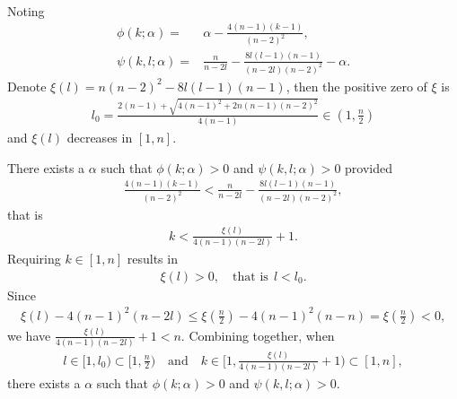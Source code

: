 \documentclass[12pt]{amsart}
\numberwithin{equation}{section}
\begin{document}
\ \\

Noting
\begin{align*}
    \phi(k;\alpha)=&\alpha-\frac{4(n-1)(k-1)}{(n-2)^2},\\
    \psi(k,l;\alpha)=&\frac{n}{n-2l}-\frac{8l(l-1)(n-1)}{(n-2l)(n-2)^2}-\alpha.
\end{align*}
Denote $\xi(l)=n(n-2)^2-8l(l-1)(n-1)$, then the positive zero of $\xi$ is 
\begin{align*}
    l_0=\frac{2(n-1)+\sqrt{4(n-1)^2+2n(n-1)(n-2)^2}}{4(n-1)}\in(1,\frac{n}{2})
\end{align*}
and $\xi(l)$ decreases in $[1,n]$.

There exists a $\alpha$ such that $\phi(k;\alpha)>0$ and $\psi(k,l;\alpha)>0$ provided
\begin{align*}
    \frac{4(n-1)(k-1)}{(n-2)^2}<\frac{n}{n-2l}-\frac{8l(l-1)(n-1)}{(n-2l)(n-2)^2},
\end{align*}
that is
\begin{align*}
    k<\frac{\xi(l)}{4(n-1)(n-2l)}+1.
\end{align*}
Requiring $k\in[1,n]$ results in
\begin{align*}
    \xi(l)>0,\quad \text{that is}\ \ l<l_0.
\end{align*}
Since 
\begin{align*}
    \xi(l)-4(n-1)^2(n-2l)\leq\xi(\frac{n}{2})-4(n-1)^2(n-n)=\xi(\frac{n}{2})<0,
\end{align*}
we have $\frac{\xi(l)}{4(n-1)(n-2l)}+1<n$. Combining together, when
\begin{align*}
    l\in[1,l_0)\subset[1,\frac{n}{2})\quad\text{and}\quad k\in[1,\frac{\xi(l)}{4(n-1)(n-2l)}+1)\subset[1,n],
\end{align*}
there exists a $\alpha$ such that $\phi(k;\alpha)>0$ and $\psi(k,l;\alpha)>0$.
\end{document}
